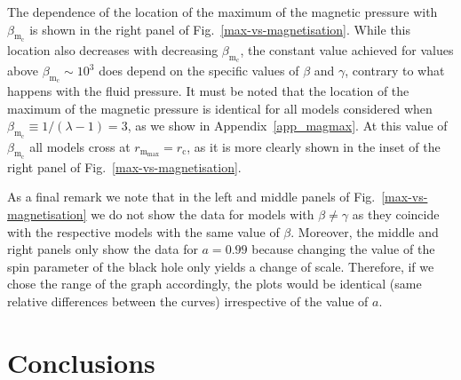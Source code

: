 \documentclass{aa}
\begin{document}
The dependence of the location of the maximum of the magnetic pressure with $\beta_{\mathrm{m}_{\mathrm{c}}}$ is shown in the right panel of Fig.~\ref{max-vs-magnetisation}. While this location also decreases with decreasing $\beta_{\mathrm{m}_{\mathrm{c}}}$, the constant value achieved for values above $\beta_{\mathrm{m}_{\mathrm{c}}}\sim 10^{3}$ does depend on the specific values of $\beta$ and $\gamma$, contrary to what happens with the fluid pressure. It must be noted that the location of the maximum of the magnetic pressure is identical for all models considered when $\beta_{\mathrm{m}_{\mathrm{c}}} \equiv 1/(\lambda - 1) = 3$, as we show in Appendix~\ref{app_magmax}. At this value of $\beta_{\mathrm{m}_{\mathrm{c}}}$ all models cross at $r_{\mathrm{m}_{\mathrm{max}}} = r_{\mathrm{c}}$, as it is more clearly shown in the inset of the right panel of Fig.~\ref{max-vs-magnetisation}.


As a final remark we note that in the left and middle panels of Fig.~\ref{max-vs-magnetisation} we do not show the data for models with $\beta \neq \gamma$ as they coincide with the respective models with the same value of $\beta$. Moreover, the middle and right panels only show the data for $a=0.99$ because changing the value of the spin parameter of the black hole only yields a change of scale. Therefore, if we chose the range of the graph accordingly, the plots would be identical (same relative differences between the curves) irrespective of the value of $a$.

\section{Conclusions}
\label{conclusions}
\end{document}
